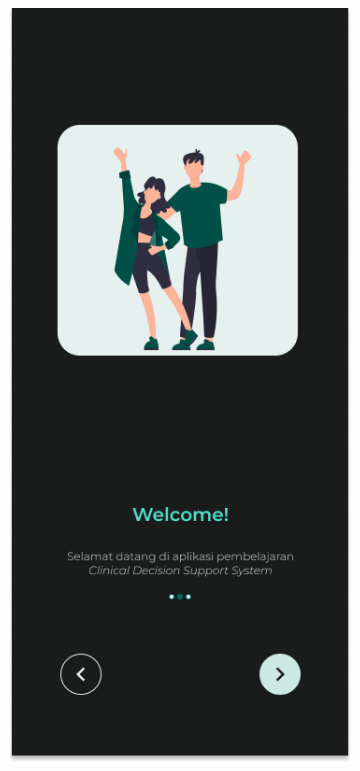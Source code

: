 \begin{figure}[H]
	\centering
	\begin{subfigure}[b]{0.23\textwidth}
		\centering
	  \includegraphics[width=\linewidth]{contents/chapter-3/images/HF-Boarding-1-dt.png}

\end{subfigure}
\end{figure}
